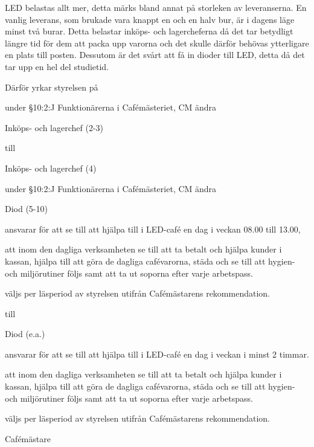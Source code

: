 \documentclass[../_main/handlingar.tex]{subfiles}
\begin{document}

LED belastas allt mer, detta märks bland annat på storleken av leveranserna. En vanlig leverans, som brukade vara knappt en och en halv bur, är  i dagens läge minst två burar. Detta belastar inköps- och lagercheferna då det tar betydligt längre tid för dem att packa upp varorna och det skulle därför behövas ytterligare en plats till posten. Dessutom är det svårt att få in dioder till LED, detta då det tar upp en hel del studietid.

Därför yrkar styrelsen på
\begin{attsatser}
    \att under \S10:2:J Funktionärerna i Cafémästeriet, CM ändra\par
    \begin{itshape}
        Inköps- och lagerchef (2-3)
    \end{itshape}\par
    till\par
    \begin{itshape}
        Inköps- och lagerchef (4)
    \end{itshape}

    \att under \S10:2:J Funktionärerna i Cafémästeriet, CM ändra\par
    \begin{itshape}
        Diod (5-10)
        \begin{tightdashlist}
            \item ansvarar för att se till att hjälpa till i LED-café en dag i veckan 08.00 till 13.00,
            \item att inom den dagliga verksamheten se till att ta betalt och hjälpa kunder i kassan, hjälpa till att göra de dagliga cafévarorna, städa och se till att hygien- och miljörutiner följs samt att ta ut soporna efter varje arbetspass.
            \item väljs per läsperiod av styrelsen utifrån Cafémästarens rekommendation.
        \end{tightdashlist}
    \end{itshape}\par
    till\par
    \begin{itshape}
        Diod (e.a.)
        \begin{tightdashlist}
            \item ansvarar för att se till att hjälpa till i LED-café en dag i veckan i minst 2 timmar.
            \item att inom den dagliga verksamheten se till att ta betalt och hjälpa kunder i kassan, hjälpa till att göra de dagliga cafévarorna, städa och se till att hygien- och miljörutiner följs samt att ta ut soporna efter varje arbetspass.
            \item väljs per läsperiod av styrelsen utifrån Cafémästarens rekommendation.
        \end{tightdashlist}
    \end{itshape}
\end{attsatser}

\begin{signatures}{1}
    \ist
    \signature{Stephanie Mirsky}{Cafémästare}
\end{signatures}
\end{document}
